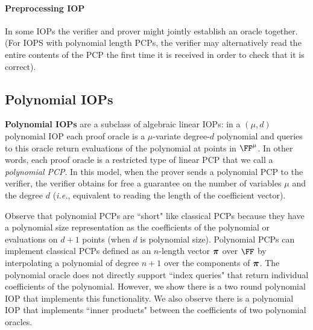 
\paragraph{Preprocessing IOP} In some IOPs the verifier and prover might jointly establish an oracle together. (For IOPS with polynomial length PCPs, the verifier may alternatively read the entire contents of the PCP the first time it is received in order to check that it is correct). 

\subsection{Polynomial IOPs} 
\textbf{Polynomial IOPs} are a subclass of algebraic linear IOPs: in a $(\mu, d)$ polynomial IOP each proof oracle is a $\mu$-variate degree-$d$ polynomial and queries to this oracle return evaluations of the polynomial at points in $\FF^\mu$. In other words, each proof oracle is a restricted type of linear PCP that we call a \emph{polynomial PCP}. In this model, when the prover sends a polynomial PCP to the verifier, the verifier obtains for free a guarantee on the number of variables $\mu$ and the degree $d$ (\emph{i.e.}, equivalent to reading the length of the coefficient vector). 

Observe that polynomial PCPs are ``short" like classical PCPs because they have a polynomial size representation as the coefficients of the polynomial or evaluations on $d+1$ points (when $d$ is polynomial size). Polynomial PCPs can implement classical PCPs defined as an $n$-length vector $\boldsymbol{\pi}$ over $\FF$ by interpolating a polynomial of degree $n+1$ over the components of $\boldsymbol{\pi}$. The polynomial oracle does not directly support ``index queries" that return individual coefficients of the polynomial. However, we show there is a two round polynomial IOP that implements this functionality. We also observe there is a polynomial IOP that implements ``inner products" between the coefficients of two polynomial oracles. 


